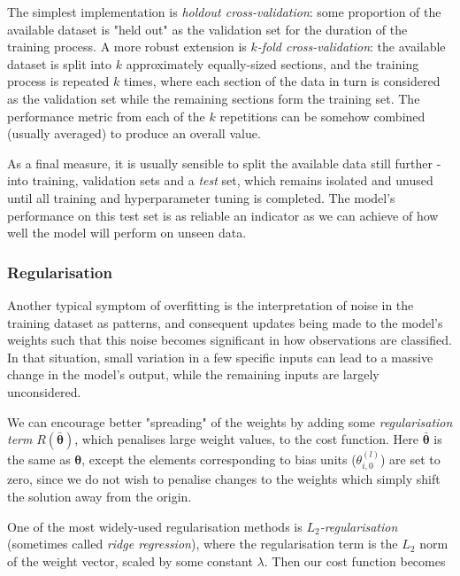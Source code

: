 \documentclass{article}[11pt]
\begin{document}
            The simplest implementation is \textit{holdout cross-validation}: some proportion of the available dataset is "held out" as the validation set for the duration of the training process. A more robust extension is \textit{$k$-fold cross-validation}: the available dataset is split into $k$ approximately equally-sized sections, and the training process is repeated $k$ times, where each section of the data in turn is considered as the validation set while the remaining sections form the training set. The performance metric from each of the $k$ repetitions can be somehow combined (usually averaged) to produce an overall value.
            
            As a final measure, it is usually sensible to split the available data still further - into training, validation sets and a \textit{test} set, which remains isolated and unused until all training and hyperparameter tuning is completed. The model's performance on this test set is as reliable an indicator as we can achieve of how well the model will perform on unseen data.
        
        
  
        \subsubsection{Regularisation}
            
            Another typical symptom of overfitting is the interpretation of noise in the training dataset as patterns, and consequent updates being made to the model's weights such that this noise becomes significant in how observations are classified. In that situation, small variation in a few specific inputs can lead to a massive change in the model's output, while the remaining inputs are largely unconsidered.
            
            We can encourage better "spreading" of the weights by adding some \textit{regularisation term} $R(\boldsymbol{\bar{\theta}})$, which penalises large weight values, to the cost function. Here $\boldsymbol{\bar{\theta}}$ is the same as $\boldsymbol{\theta}$, except the elements corresponding to bias units ($\theta^{(l)}_{i,0}$) are set to zero, since we do not wish to penalise changes to the weights which simply shift the solution away from the origin.
            
            One of the most widely-used regularisation methods is \textit{$L_2$-regularisation} (sometimes called \textit{ridge regression}), where the regularisation term is the $L_2$ norm of the weight vector, scaled by some constant $\lambda$. Then our cost function becomes
            
\end{document}
